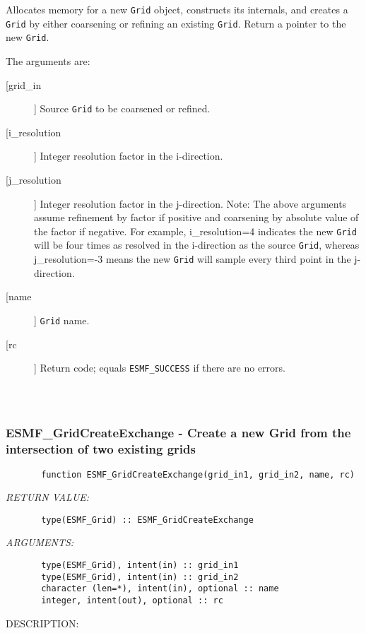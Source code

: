        Allocates memory for a new {\tt Grid} object, constructs its
       internals, and creates a {\tt Grid} by either coarsening or refining an
       existing {\tt Grid}.  Return a pointer to the new {\tt Grid}.
  
       The arguments are:
       \begin{description}
       \item[[grid\_in]]
            Source {\tt Grid} to be coarsened or refined.
       \item[[i\_resolution]]
            Integer resolution factor in the i-direction.
       \item[[j\_resolution]]
            Integer resolution factor in the j-direction.
            Note:  The above arguments assume refinement by factor if positive
            and coarsening by absolute value of the factor if negative.  For
            example, i\_resolution=4 indicates the new {\tt Grid} will be four
            times as resolved in the i-direction as the source {\tt Grid},
            whereas j\_resolution=-3 means the new {\tt Grid} will sample every
            third point in the j-direction.
       \item[[name]]
            {\tt Grid} name.
       \item[[rc]]
            Return code; equals {\tt ESMF\_SUCCESS} if there are no errors.
     \end{description}
  
\begin{verbatim} \end{verbatim}
 
 
\mbox{}\hrulefill\ 
 
\subsubsection{ESMF\_GridCreateExchange - Create a new Grid from the intersection of two existing grids}


\begin{verbatim}       function ESMF_GridCreateExchange(grid_in1, grid_in2, name, rc)\end{verbatim}{\em RETURN VALUE:}
\begin{verbatim}       type(ESMF_Grid) :: ESMF_GridCreateExchange\end{verbatim}{\em ARGUMENTS:}
\begin{verbatim}       type(ESMF_Grid), intent(in) :: grid_in1
       type(ESMF_Grid), intent(in) :: grid_in2
       character (len=*), intent(in), optional :: name
       integer, intent(out), optional :: rc\end{verbatim}
{\sf DESCRIPTION:\\ }


